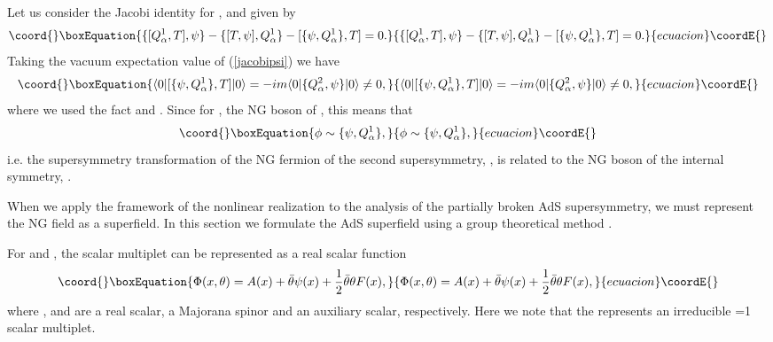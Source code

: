 \documentclass[a4paper,12pt]{article}
\def\btheta{\bar{\theta}}
\begin{document}
Let us consider the Jacobi identity for \coordHE{}, \coordHE{} and \myHighlight{$\psi$}\coordHE{} given
by 
\begin{equation}\coord{}\boxEquation{
 \{[Q^{1}_{\alpha},T], \psi\} - \{[T, \psi], Q^{1}_{\alpha}\}
  -[\{\psi, Q^{1}_{\alpha}\}, T] = 0.
	\label{jacobipsi}
}{
 \{[Q^{1}_{\alpha},T], \psi\} - \{[T, \psi], Q^{1}_{\alpha}\}
  -[\{\psi, Q^{1}_{\alpha}\}, T] = 0.
	}{ecuacion}\coordE{}\end{equation}
Taking the vacuum expectation value of (\ref{jacobipsi}) we have
\begin{equation}\coord{}\boxEquation{
 \langle 0|[ \{\psi, Q^{1}_{\alpha}\}, T]|0\rangle =
  -im\langle 0| \{Q^{2}_{\alpha}, \psi\}|0\rangle \neq 0,
}{
 \langle 0|[ \{\psi, Q^{1}_{\alpha}\}, T]|0\rangle =
  -im\langle 0| \{Q^{2}_{\alpha}, \psi\}|0\rangle \neq 0,
}{ecuacion}\coordE{}\end{equation}
where we used the fact \coordHE{} and
 \coordHE{}.
Since \coordHE{} for \myHighlight{$\phi$}\coordHE{}, the NG boson 
of \coordHE{}, this means that
\begin{equation}\coord{}\boxEquation{
 \phi \sim \{\psi, Q^{1}_{\alpha}\},
}{
 \phi \sim \{\psi, Q^{1}_{\alpha}\},
}{ecuacion}\coordE{}\end{equation}
i.e. the supersymmetry transformation of the NG fermion of the second
supersymmetry, \myHighlight{$\psi$}\coordHE{}, is related to the NG boson of the
internal symmetry, \myHighlight{$\phi$}\coordHE{}.

\vspace{0.3cm}
\vspace{0.3cm}

When we apply the framework of the nonlinear realization \cite{CWZOg} to the
analysis of the partially broken AdS supersymmetry, we must
represent the NG field as a superfield. In this section we
formulate the AdS superfield using a group theoretical method \cite{IS}.

For \coordHE{} and \coordHE{}, the \coordHE{} scalar multiplet
can be represented as a real scalar function \coordHE{} 
\begin{equation}\coord{}\boxEquation{
 \Phi(x,\theta) = A(x) + \btheta\psi(x) + \frac{1}{2}\btheta\theta F(x),
  \label{2dflatphi}
}{
 \Phi(x,\theta) = A(x) + \btheta\psi(x) + \frac{1}{2}\btheta\theta F(x),
  }{ecuacion}\coordE{}\end{equation}
where \coordHE{}, \coordHE{} and \coordHE{} 
are a real scalar, a Majorana
spinor and an auxiliary scalar, respectively.
Here we note that the \myHighlight{$\Phi$}\coordHE{} represents an irreducible \coordHE{}=1 scalar multiplet.
\end{document}
